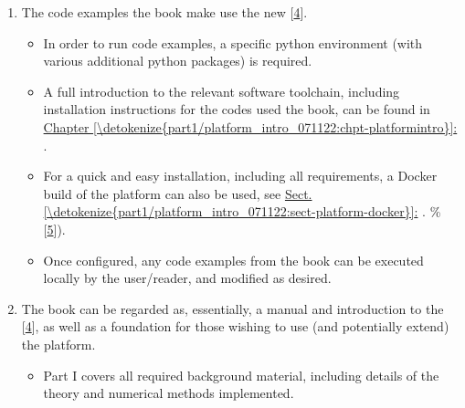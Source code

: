 \documentclass[letterpaper,table,10pt,english]{jupyterBook}
\begin{document}
\begin{enumerate}
\item {} 
\sphinxAtStartPar
The code examples  the book make use the new  {[}\hyperlink{cite.backmatter/bibliography:id574}{4}{]}.
\begin{itemize}
\item {} 
\sphinxAtStartPar
In order to run code examples, a specific python environment (with various additional python packages) is required.

\item {} 
\sphinxAtStartPar
A full introduction to the relevant software tool\sphinxhyphen{}chain, including installation instructions for the codes used  the book, can be found in \hyperref[\detokenize{part1/platform_intro_071122:chpt-platformintro}]{Chapter \ref{\detokenize{part1/platform_intro_071122:chpt-platformintro}}:} {\hyperref[\detokenize{part1/platform_intro_071122:chpt-platformintro}]{}}.

\item {} 
\sphinxAtStartPar
For a quick and easy installation, including all requirements, a Docker build  of the platform can also be used, see \hyperref[\detokenize{part1/platform_intro_071122:sect-platform-docker}]{Sect.\@ \ref{\detokenize{part1/platform_intro_071122:sect-platform-docker}}:} {\hyperref[\detokenize{part1/platform_intro_071122:sect-platform-docker}]{}}.  \%  {[}\hyperlink{cite.backmatter/bibliography:id577}{5}{]}).

\item {} 
\sphinxAtStartPar
Once configured, any code examples from the book can be executed locally by the user/reader, and modified as desired.

\end{itemize}

\item {} 
\sphinxAtStartPar
The book can be regarded as, essentially, a manual and introduction to the  {[}\hyperlink{cite.backmatter/bibliography:id574}{4}{]}, as well as a foundation for those wishing to use (and potentially extend) the platform.
\begin{itemize}
\item {} 
\sphinxAtStartPar
Part I covers all required background material, including details of the theory and numerical methods implemented.


\end{itemize}
\end{enumerate}
\end{document}

